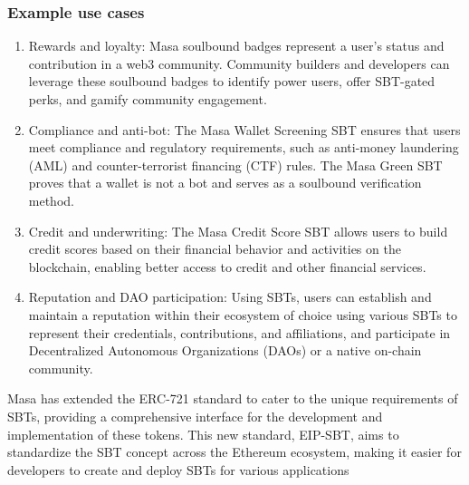 \documentclass{article}
\begin{document}
\subsubsection{Example use cases}
\begin{enumerate}[label=\arabic*.]
    \item Rewards and loyalty: Masa soulbound badges represent a user’s status and contribution in a web3 community. Community builders and developers can leverage these soulbound badges to identify power users, offer SBT-gated perks, and gamify community engagement.
    \item Compliance and anti-bot: The Masa Wallet Screening SBT ensures that users meet compliance and regulatory requirements, such as anti-money laundering (AML) and counter-terrorist financing (CTF) rules. The Masa Green SBT proves that a wallet is not a bot and serves as a soulbound verification method.
    \item Credit and underwriting: The Masa Credit Score SBT allows users to build credit scores based on their financial behavior and activities on the blockchain, enabling better access to credit and other financial services.
    \item Reputation and DAO participation: Using SBTs, users can establish and maintain a reputation within their ecosystem of choice using various SBTs to represent their credentials, contributions, and affiliations, and participate in Decentralized Autonomous Organizations (DAOs) or a native on-chain community.
  \end{enumerate}

Masa has extended the ERC-721 standard to cater to the unique requirements of SBTs, providing a comprehensive interface for the development and implementation of these tokens. This new standard, EIP-SBT, aims to standardize the SBT concept across the Ethereum ecosystem, making it easier for developers to create and deploy SBTs for various applications
\end{document}
